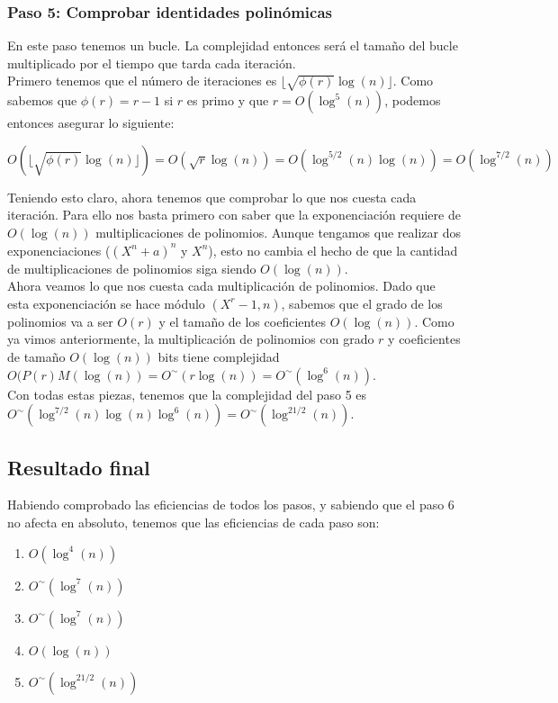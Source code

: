 \subsubsection{Paso 5: Comprobar identidades polinómicas}

En este paso tenemos un bucle. La complejidad entonces será el tamaño del bucle multiplicado por el tiempo que tarda cada iteración.\\

Primero tenemos que el número de iteraciones es $\lfloor \sqrt{\phi(r)}\log(n) \rfloor$. Como sabemos que $\phi(r) = r-1$ si $r$ es primo y que $r = O(\log^5(n))$, podemos entonces asegurar lo siguiente:

$$O\left(\lfloor \sqrt{\phi(r)}\log(n) \rfloor\right) = O(\sqrt{r}\log(n)) = O(\log^{5/2}(n)\log(n)) = O(\log^{7/2}(n))$$

Teniendo esto claro, ahora tenemos que comprobar lo que nos cuesta cada iteración. Para ello nos basta primero con saber que la exponenciación requiere de $O(\log(n))$ multiplicaciones de polinomios. Aunque tengamos que realizar dos exponenciaciones ($(X^n + a)^n$ y $X^n$), esto no cambia el hecho de que la cantidad de multiplicaciones de polinomios siga siendo $O(\log(n))$.\\

Ahora veamos lo que nos cuesta cada multiplicación de polinomios. Dado que esta exponenciación se hace módulo $(X^r - 1, n)$, sabemos que el grado de los polinomios va a ser $O(r)$ y el tamaño de los coeficientes $O(\log(n))$. Como ya vimos anteriormente, la multiplicación de polinomios con grado $r$ y coeficientes de tamaño $O(\log(n))$ bits tiene complejidad $O(P(r)M(\log(n)) = O^\sim(r\log(n)) = O^\sim(\log^6(n))$.\\

Con todas estas piezas, tenemos que la complejidad del paso 5 es $O^\sim(\log^{7/2}(n)\log(n)\log^6(n)) = O^\sim(\log^{21/2}(n))$.

\subsection{Resultado final}

Habiendo comprobado las eficiencias de todos los pasos, y sabiendo que el paso 6 no afecta en absoluto, tenemos que las eficiencias de cada paso son:

\begin{enumerate}
	\item $O(\log^4(n))$
	\item $O^\sim(\log^7(n))$
	\item $O^\sim(\log^7(n))$
	\item $O(\log(n))$
	\item $O^\sim(\log^{21/2}(n))$
\end{enumerate}

